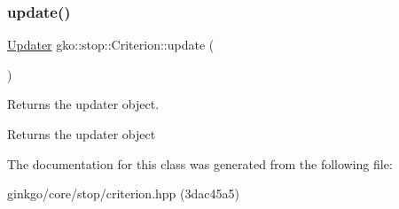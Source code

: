 \subsubsection{\texorpdfstring{update()}{update()}}
{\footnotesize\ttfamily \hyperlink{classgko_1_1stop_1_1Criterion_1_1Updater}{Updater} gko\+::stop\+::\+Criterion\+::update (\begin{DoxyParamCaption}{ }\end{DoxyParamCaption})\hspace{0.3cm}{\ttfamily [inline]}}



Returns the updater object. 

\begin{DoxyReturn}{Returns}
the updater object 
\end{DoxyReturn}


The documentation for this class was generated from the following file\+:\begin{DoxyCompactItemize}
\item 
ginkgo/core/stop/criterion.\+hpp (3dac45a5)\end{DoxyCompactItemize}
